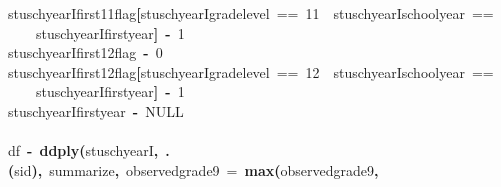 \documentclass[12pt]{article}
\makeatletter
\newcommand{\hlnumber}[1]{\textcolor[rgb]{0,0,0}{#1}}%
\newcommand{\hlfunctioncall}[1]{\textcolor[rgb]{0.501960784313725,0,0.329411764705882}{\textbf{#1}}}%
\newcommand{\hlkeyword}[1]{\textcolor[rgb]{0,0,0}{\textbf{#1}}}%
\newcommand{\hlargument}[1]{\textcolor[rgb]{0.690196078431373,0.250980392156863,0.0196078431372549}{#1}}%
\newcommand{\hlassignement}[1]{\textcolor[rgb]{0,0,0}{\textbf{#1}}}%
\newcommand{\hlsymbol}[1]{\textcolor[rgb]{0,0,0}{#1}}%
\newcommand{\hlstd}[1]{\textcolor[rgb]{0,0,0}{#1}}%
\newenvironment{kframe}{%
 \def\FrameCommand##1{\hskip\@totalleftmargin \hskip-\fboxsep
 \colorbox{shadecolor}{##1}\hskip-\fboxsep
     \hskip-\linewidth \hskip-\@totalleftmargin \hskip\columnwidth}%
 \MakeFramed {\advance\hsize-\width
   \@totalleftmargin\z@ \linewidth\hsize
   \@setminipage}}%
 {\par\unskip\endMakeFramed}
\newenvironment{knitrout}{}{} %
\renewenvironment{knitrout}{\begin{footnotesize}}{\end{footnotesize}}
\makeatother
\begin{document}
\begin{knitrout}
\begin{kframe}
\begin{flushleft}
\hlstd{}\hlsymbol{stuschyearI}\hlkeyword{\usebox{\hlnormalsizeboxdollar}}\hlsymbol{first11\usebox{\hlnormalsizeboxunderscore}flag}\hlkeyword{[}\hlsymbol{stuschyearI}\hlkeyword{\usebox{\hlnormalsizeboxdollar}}\hlsymbol{grade\usebox{\hlnormalsizeboxunderscore}level}{\ }=={\ }\hlnumber{11}{\ }\hlkeyword{\usebox{\hlnormalsizeboxand}}{\ }\hlsymbol{stuschyearI}\hlkeyword{\usebox{\hlnormalsizeboxdollar}}\hlsymbol{school\usebox{\hlnormalsizeboxunderscore}year}{\ }==\hspace*{\fill}\\
\hlstd{}{\ }{\ }{\ }{\ }\hlsymbol{stuschyearI}\hlkeyword{\usebox{\hlnormalsizeboxdollar}}\hlsymbol{first\usebox{\hlnormalsizeboxunderscore}year}\hlkeyword{]}{\ }\hlassignement{\usebox{\hlnormalsizeboxlessthan}-}{\ }\hlnumber{1}\hspace*{\fill}\\
\hlstd{}\hlsymbol{stuschyearI}\hlkeyword{\usebox{\hlnormalsizeboxdollar}}\hlsymbol{first12\usebox{\hlnormalsizeboxunderscore}flag}{\ }\hlassignement{\usebox{\hlnormalsizeboxlessthan}-}{\ }\hlnumber{0}\hspace*{\fill}\\
\hlstd{}\hlsymbol{stuschyearI}\hlkeyword{\usebox{\hlnormalsizeboxdollar}}\hlsymbol{first12\usebox{\hlnormalsizeboxunderscore}flag}\hlkeyword{[}\hlsymbol{stuschyearI}\hlkeyword{\usebox{\hlnormalsizeboxdollar}}\hlsymbol{grade\usebox{\hlnormalsizeboxunderscore}level}{\ }=={\ }\hlnumber{12}{\ }\hlkeyword{\usebox{\hlnormalsizeboxand}}{\ }\hlsymbol{stuschyearI}\hlkeyword{\usebox{\hlnormalsizeboxdollar}}\hlsymbol{school\usebox{\hlnormalsizeboxunderscore}year}{\ }==\hspace*{\fill}\\
\hlstd{}{\ }{\ }{\ }{\ }\hlsymbol{stuschyearI}\hlkeyword{\usebox{\hlnormalsizeboxdollar}}\hlsymbol{first\usebox{\hlnormalsizeboxunderscore}year}\hlkeyword{]}{\ }\hlassignement{\usebox{\hlnormalsizeboxlessthan}-}{\ }\hlnumber{1}\hspace*{\fill}\\
\hlstd{}\hlsymbol{stuschyearI}\hlkeyword{\usebox{\hlnormalsizeboxdollar}}\hlsymbol{first\usebox{\hlnormalsizeboxunderscore}year}{\ }\hlassignement{\usebox{\hlnormalsizeboxlessthan}-}{\ }NULL\hspace*{\fill}\\
\hlstd{}\hspace*{\fill}\\
\hlstd{}\hlsymbol{df}{\ }\hlassignement{\usebox{\hlnormalsizeboxlessthan}-}{\ }\hlfunctioncall{ddply}\hlkeyword{(}\hlsymbol{stuschyearI}\hlkeyword{,}{\ }\hlfunctioncall{.}\hlkeyword{(}\hlsymbol{sid}\hlkeyword{)}\hlkeyword{,}{\ }\hlsymbol{summarize}\hlkeyword{,}{\ }\hlargument{observed\usebox{\hlnormalsizeboxunderscore}grade\usebox{\hlnormalsizeboxunderscore}9}{\ }\hlargument{=}{\ }\hlfunctioncall{max}\hlkeyword{(}\hlsymbol{observed\usebox{\hlnormalsizeboxunderscore}grade\usebox{\hlnormalsizeboxunderscore}9}\hlkeyword{,}\hspace*{\fill}\\

\end{flushleft}
\end{kframe}
\end{knitrout}
\end{document}
